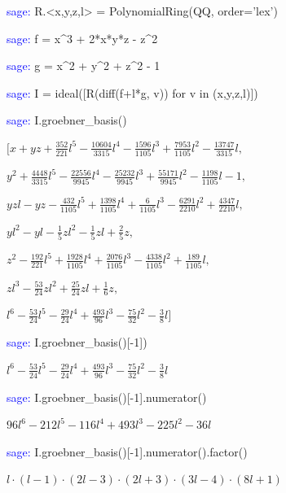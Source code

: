 \documentclass{beamer}
\begin{document}
\begin{frame}
\begin{semiverbatim}
\textcolor{blue}{sage:} R.<x,y,z,l> = PolynomialRing(QQ, order='lex')

\textcolor{blue}{sage:} f = x\^{}3 + 2*x*y*z - z\^{}2

\textcolor{blue}{sage:} g = x\^{}2 + y\^{}2 + z\^{}2 - 1

\textcolor{blue}{sage:} I = ideal([R(diff(f+l*g, v)) for v in (x,y,z,l)])

\textcolor{blue}{sage:} I.groebner\_basis()

$[x + y z + \frac{352}{221} l^{5} - \frac{10604}{3315} l^{4} - \frac{1596}{1105} l^{3} + \frac{7953}{1105} l^{2} - \frac{13747}{3315} l,$

$\allowbreak y^{2} + \frac{4448}{3315} l^{5} - \frac{22556}{9945} l^{4} - \frac{25232}{9945} l^{3} + \frac{55171}{9945} l^{2} - \frac{1198}{1105} l - 1,$

$y z l - y z - \frac{432}{1105} l^{5} + \frac{1398}{1105} l^{4} + \frac{6}{1105} l^{3} - \frac{6291}{2210} l^{2} + \frac{4347}{2210} l,$

$y l^{2} - y l - \frac{1}{5} z l^{2} - \frac{1}{5} z l + \frac{2}{5} z,$

$z^{2} - \frac{192}{221} l^{5} + \frac{1928}{1105} l^{4} + \frac{2076}{1105} l^{3} - \frac{4338}{1105} l^{2} + \frac{189}{1105} l,$

$z l^{3} - \frac{53}{24} z l^{2} + \frac{25}{24} z l + \frac{1}{6} z,$

$l^{6} - \frac{53}{24} l^{5} - \frac{29}{24} l^{4} + \frac{493}{96} l^{3} - \frac{75}{32} l^{2} - \frac{3}{8} l]$

\textcolor{blue}{sage:} I.groebner\_basis()[-1])

$l^{6} - \frac{53}{24} l^{5} - \frac{29}{24} l^{4} + \frac{493}{96} l^{3} - \frac{75}{32} l^{2} - \frac{3}{8} l$

\textcolor{blue}{sage:} I.groebner\_basis()[-1].numerator()

$96 l^{6} - 212 l^{5} - 116 l^{4} + 493 l^{3} - 225 l^{2} - 36 l$

\textcolor{blue}{sage:} I.groebner\_basis()[-1].numerator().factor()

$l \cdot (l - 1) \cdot (2 l - 3) \cdot (2 l + 3) \cdot (3 l - 4) \cdot (8 l + 1)$

\end{semiverbatim}
\end{frame}
\end{document}
